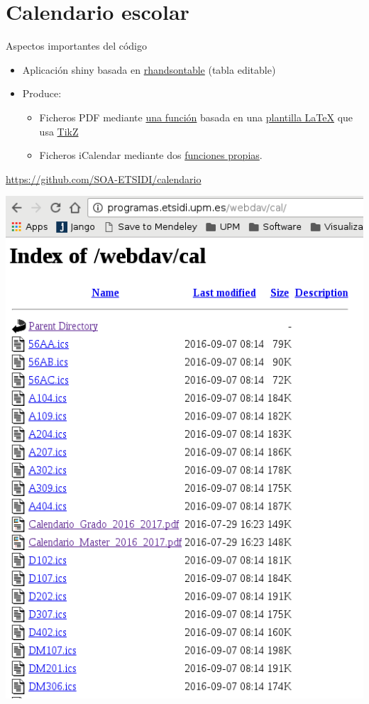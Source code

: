 \documentclass[spanish, xcolor={usenames,svgnames,dvipsnames}]{beamer}
\begin{document}
\section{Calendario escolar}
\label{sec:org5965db1}
\begin{frame}[label={sec:org8f7385e}]{Aspectos importantes del código}
\begin{itemize}
\item Aplicación shiny basada en \href{http://jrowen.github.io/rhandsontable/}{rhandsontable} (tabla editable)
\item Produce:
\begin{itemize}
\item Ficheros PDF mediante \href{https://github.com/SOA-ETSIDI/calendario/blob/master/csv2pdf.R}{una función} basada en una \href{https://github.com/SOA-ETSIDI/calendario/blob/master/documentCal.tex}{plantilla \LaTeX{}} que usa \href{https://en.wikipedia.org/wiki/PGF/TikZ}{TikZ}
\item Ficheros iCalendar mediante dos \href{https://github.com/SOA-ETSIDI/calendario/blob/master/csv2ics.R}{funciones propias}.
\end{itemize}
\end{itemize}
\begin{block}{}
\url{https://github.com/SOA-ETSIDI/calendario}
\end{block}
\end{frame}

\begin{frame}[label={sec:org3c217c5}]{}
\begin{center}
\includegraphics[width=.9\linewidth]{images/webdav_cal.png}
\end{center}
\end{frame}
\end{document}
